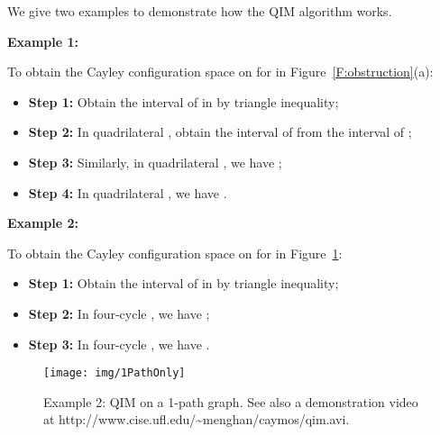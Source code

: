 \documentclass[secthm,amsthm,english]{article}
\theoremstyle{definition}
\theoremstyle{remark}
\begin{document}
\smallskip

\noindent We give two examples to demonstrate how the QIM algorithm works. 

\noindent \textbf{Example 1: } 

To obtain the Cayley configuration space on  for  in 
Figure~\ref{F:obstruction}(a): 


\begin{itemize}
\item \textbf{Step 1:} 
Obtain the interval of  in  by triangle inequality; 

\item \textbf{Step 2:} In quadrilateral , obtain
the interval of  from the interval of ;

\item \textbf{Step 3:} Similarly, in quadrilateral , 
we have ;

\item \textbf{Step 4:} In quadrilateral , 
we have . 
\end{itemize}

\smallskip

\noindent \textbf{Example 2: } 

To obtain the Cayley configuration space on  for  in 
Figure~\ref{F:1PathOnly}: 

\begin{itemize}
\item \textbf{Step 1:} 
Obtain the interval of  in  by triangle inequality; 

\item \textbf{Step 2:} In four-cycle ,
we have ; 

\item \textbf{Step 3:}  In four-cycle ,
we have .  	
\end{itemize}



\begin{figure}[h]
	 
	      
	   
	   
	   
	
	\begin{centering}
	\texttt{[image: img/1PathOnly]} 
	\par\end{centering}
	
	\caption{ Example 2:  QIM on a 1-path graph. See also a demonstration video at http://www.cise.ufl.edu/\~{}menghan/caymos/qim.avi. }
\label{F:1PathOnly} 
\end{figure}
\end{document}
